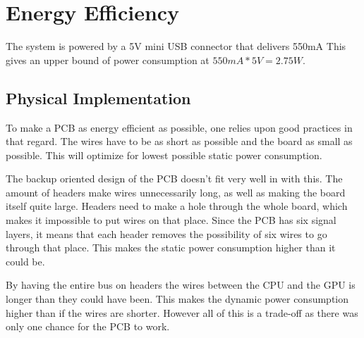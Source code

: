 \section{Energy Efficiency}

The system is powered by a 5V mini USB connector that delivers 550mA 
This gives an upper bound of power consumption at $550mA * 5V = 2.75W$.

\subsection{Physical Implementation}

To make a PCB as energy efficient as possible, one relies upon good practices in that regard.
The wires have to be as short as possible and the board as small as possible.
This will optimize for lowest possible static power consumption.

The backup oriented design of the PCB doesn't fit very well in with this.
The amount of headers make wires unnecessarily long, as well as making the board itself quite large.
Headers need to make a hole through the whole board, which makes it impossible to put wires on that place.
Since the PCB has six signal layers, it means that each header removes the possibility of six wires to go through that place.
This makes the static power consumption higher than it could be.

By having the entire bus on headers the wires between the CPU and the GPU is longer than they could have been.
This makes the dynamic power consumption higher than if the wires are shorter.
However all of this is a trade-off as there was only one chance for the PCB to work.

